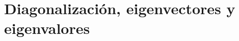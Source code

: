 \documentclass[notasLineal]{subfiles}
\begin{document}
\section{Diagonalización, eigenvectores y eigenvalores}\label{Sec: Diagonalización, eigenvectores y eigenvalores}
\end{document}
